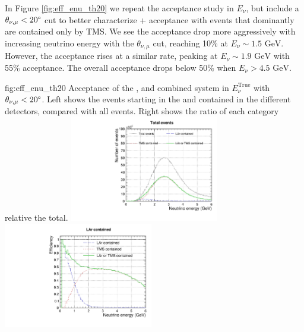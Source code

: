 In Figure \ref{fig:eff_enu_th20} we repeat the acceptance study in $E_\nu$, but include a $\theta_{\nu,\mu}<20\degree$ cut to better characterize + acceptance with events that dominantly are contained only by TMS. We see the  acceptance drop more aggressively with increasing neutrino energy with the $\theta_{\nu,\mu}$ cut, reaching 10\% at $E_\nu\sim 1.5\text{ GeV}$. However, the  acceptance rises at a similar rate, peaking at $E_\nu\sim1.9\text{ GeV}$ with 55\% acceptance. The overall acceptance drops below 50\% when $E_\nu>4.5\text{ GeV}$.
\begin{dunefigure}{fig:eff_enu_th20}
{Acceptance of the ,  and combined system in $E_\nu^\text{True}$ with $\theta_{\nu,\mu}<20\degree$. Left shows the events starting in the  and contained in the different detectors, compared with all events. Right shows the ratio of each category relative the total.}
\includegraphics[width=0.49\textwidth, clip, trim={0mm 0mm 0mm 10mm}]{graphics/tms/Simulation/Efficiency/eff_20deg.pdf} \includegraphics[width=0.49\textwidth, clip, trim={0mm 0mm 0mm 10mm}]{graphics/tms/Simulation/Efficiency/eff_ratio_20deg.pdf}
\end{dunefigure}

